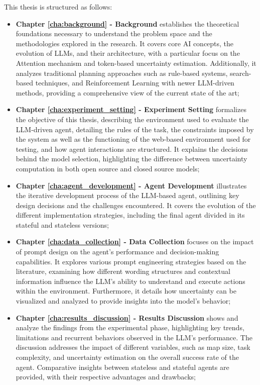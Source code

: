 This thesis is structured as follows:
\begin{itemize}
  \item \textbf{Chapter \ref{cha:background} - Background} establishes the
    theoretical foundations necessary to understand the problem space and the
    methodologies explored in the research. It covers core AI concepts, the
    evolution of LLMs, and their architecture, with a particular focus on the
    Attention mechanism and token-based uncertainty estimation. Additionally, it
    analyzes traditional planning approaches such as rule-based systems, search-based
    techniques, and Reinforcement Learning with newer LLM-driven methods, providing
    a comprehensive view of the current state of the art;

  \item \textbf{Chapter \ref{cha:experiment_setting} - Experiment Setting}
    formalizes the objective of this thesis, describing the environment used to evaluate
    the LLM-driven agent, detailing the rules of the task, the constraints imposed
    by the system as well as the functioning of the web-based environment used for
    testing, and how agent interactions are structured. It explains the decisions
    behind the model selection, highlighting the difference between uncertainty
    computation in both open source and closed source models;

  \item \textbf{Chapter \ref{cha:agent_development} - Agent Development}
    illustrates the iterative development process of the LLM-based agent, outlining
    key design decisions and the challenges encountered. It covers the evolution
    of the different implementation strategies, including the final agent divided
    in its stateful and stateless versions;

  \item \textbf{Chapter \ref{cha:data_collection} - Data Collection} focuses on
    the impact of prompt design on the agent's performance and decision-making
    capabilities. It explores various prompt engineering strategies based on the
    literature, examining how different wording structures and contextual
    information influence the LLM's ability to understand and execute actions
    within the environment. Furthermore, it details how uncertainty can be
    visualized and analyzed to provide insights into the model's behavior;

  \item \textbf{Chapter \ref{cha:results_discussion} - Results Discussion} shows
    and analyze the findings from the experimental phase, highlighting key trends,
    limitations and recurrent behaviors observed in the LLM's performance. The discussion
    addresses the impact of different variables, such as map size, task complexity,
    and uncertainty estimation on the overall success rate of the agent. Comparative
    insights between stateless and stateful agents are provided, with their
    respective advantages and drawbacks;


\end{itemize}
